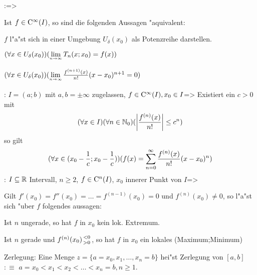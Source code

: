 \lessertheorem:=>{
  Ist $f\in{\rm C}^\infty(I)$, so sind die folgenden Aussagen "aquivalent:
  \begin{stmts}
    \item $f$ l"a"st sich in einer Umgebung $U_\delta(x_0)$ als
      Potenzreihe darstellen.
    \item $(\forall x\in U_\delta(x_0))(\limn T_n(x;x_0)=f(x))$
    \item $(\forall x\in U_\delta(x_0))
           (\limn \frac{f^{(n+1)}(x)}{n!}(x-x_0)^{n+1}=0)$
    \end{stmts}
  }
\theorem:
  $I=(a;b)$ mit $a,b=\pm\infty$ zugelassen, $f\in{\rm C}^\infty(I),x_0\in I$=>{
  Existiert ein $c>0$ mit
  \[(\forall x\in I)(\forall n\in\mathbb N_0)
      (\left|\frac{f^{(n)}(x)}{n!}\right|\le c^n)
    \]
  so gilt
  \[(\forall x\in (x_0-\frac 1 c;x_0-\frac 1 c))
      (f(x)=\sumn 0 \frac{f^{(n)}(x)}{n!}(x-x_0)^n)
    \]
  }
\theorem:
  $I\subseteq\mathbb R$ Intervall, $n\ge 2$, $f\in{\rm C}^n(I)$, 
  $x_0$ innerer Punkt von $I$=>{
  Gilt $f'(x_0)=f''(x_0)=\ldots=f^{(n-1)}(x_0)=0$ und $f^{(n)}(x_0)\ne 0$,
  so l"a"st sich "uber $f$ folgendes aussagen:
  \begin{stmts}
    \item Ist $n$ ungerade, so hat $f$ in $x_0$ kein lok. Extremum.
    \item Ist $n$ gerade und $f^{(n)}(x_0)\stack(<0;>0)$, so hat
      $f$ in $x_0$ ein lokales \tstack(Maximum;Minimum)
    \end{stmts}
  }
 Zerlegung:{
  \label{def:zerlegung}
  Eine Menge 
  $z=\{ a=x_0,x_1,\ldots,x_n=b\}$ hei"st Zerlegung von $[a,b]$ $:\equiv$
  $a=x_0<x_1<x_2<\ldots<x_n=b,n\ge 1$.
  }
